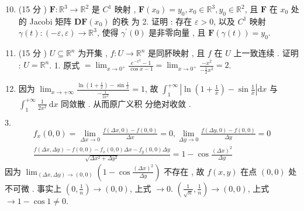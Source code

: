 \documentclass[10pt]{article}
\begin{document}
\begin{enumerate}
  \setcounter{enumi}{9}
  \item (15  分 ) $\mathbf{F}: \mathbb{R}^{3} \rightarrow \mathbb{R}^{2}$  是  $C^{1}$  映射 , $\mathbf{F}\left(x_{0}\right)=y_{0}, x_{0} \in \mathbb{R}^{3}, y_{0} \in \mathbb{R}^{2}$,  且  $\mathbf{F}$  在  $x_{0}$  处的  Jacobi  矩阵  $\mathbf{D F}\left(x_{0}\right)$  的秩   为  2.  证明 :  存在  $\varepsilon>0$,  以及  $C^{1}$  映射  $\gamma(t):(-\varepsilon, \varepsilon) \rightarrow \mathbb{R}^{3}$,  使得  $\gamma^{\prime}(0)$  是非零向量 ,  且  $\mathbf{F}(\gamma(t))=y_{0}$.

  \item (15  分 ) $U \subseteq \mathbb{R}^{n}$  为开集 , $f: U \rightarrow \mathbb{R}^{n}$  是同肧映射 ,  且  $f$  在  $U$  上一致连续 .  证明 : $U=\mathbb{R}^{n}$. 1.  原式  $=\lim _{x \rightarrow 0^{+}} \frac{e^{-x^{2}}-1}{\cos x-1}=\lim _{x \rightarrow 0^{+}} \frac{-x^{2}}{-\frac{1}{2} x^{2}}=2$.

  \item  因为  $\lim _{x \rightarrow+\infty} \frac{\ln \left(1+\frac{1}{x}\right)-\sin \frac{1}{x}}{-\frac{1}{2 x^{2}}}=1$,  故  $\int_{1}^{+\infty}\left|\ln \left(1+\frac{1}{x}\right)-\sin \frac{1}{x}\right| \mathrm{d} x$  与  $\int_{1}^{+\infty} \frac{1}{2 x^{2}} \mathrm{~d} x$  同敛散 .  从而原广义积   分绝对收敛 .

\end{enumerate}
$3 .$
$$
\begin{gathered}
f_{x}(0,0)=\lim _{\Delta x \rightarrow 0} \frac{f(\Delta x, 0)-f(0,0)}{\Delta x}=0, \lim _{\Delta y \rightarrow 0} \frac{f(\Delta y, 0)-f(0,0)}{\Delta y}=0 \\
\frac{f(\Delta x, \Delta y)-f(0,0)-f_{x}(0,0) \Delta x-f_{y}(0,0) \Delta y}{\sqrt{\Delta x^{2}+\Delta y^{2}}}=1-\cos \frac{(\Delta x)^{2}}{\Delta y}
\end{gathered}
$$
 因为  $\lim _{(\Delta x, \Delta y) \rightarrow(0,0)}\left(1-\cos \frac{(\Delta x)^{2}}{\Delta y}\right)$  不存在 ,  故  $f(x, y)$  在点  $(0,0)$  处不可微 .  事实上  $\left(0, \frac{1}{n}\right) \rightarrow(0,0)$,  上式  $\rightarrow 0$. $\left(\frac{1}{\sqrt{n}}, \frac{1}{n}\right) \rightarrow(0,0)$,  上式  $\rightarrow 1-\cos 1 \neq 0 .$
\end{document}
